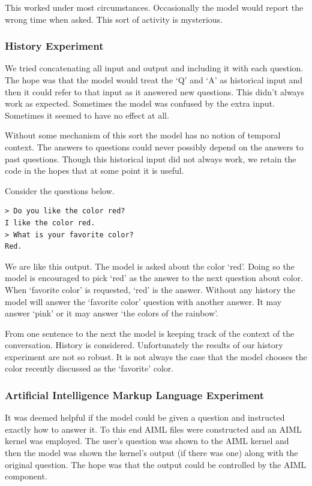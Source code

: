This worked under most circumstances. Occasionally the model would report the wrong time when asked. This sort of activity is mysterious.

\subsubsection{History Experiment}
We tried concatenating all input and output and including it with each question. The hope was that the model would treat the `Q' and `A' as historical input and then it could refer to that input as it answered new questions. This didn't always work as expected. Sometimes the model was confused by the extra input. Sometimes it seemed to have no effect at all.

Without some mechanism of this sort the model has no notion of temporal context. The answers to questions could never possibly depend on the answers to past questions. Though this historical input did not always work, we retain the code in the hopes that at some point it is useful.

Consider the questions below.
\begin{verbatim}
> Do you like the color red?
I like the color red.
> What is your favorite color?
Red.
\end{verbatim}
We are like this output. The model is asked about the color `red'. Doing so the model is encouraged to pick `red' as the answer to the next question about color. When `favorite color' is requested, `red' is the answer. Without any history the model will answer the `favorite color' question with another answer. It may answer `pink' or it may answer `the colors of the rainbow'. 

From one sentence to the next the model is keeping track of the context of the conversation. History is considered. Unfortunately the results of our history experiment are not so robust. It is not always the case that the model chooses the color recently discussed as the `favorite' color.

\subsubsection{Artificial Intelligence Markup Language Experiment}
It was deemed helpful if the model could be given a question and instructed exactly how to answer it. To this end AIML files were constructed and an AIML kernel was employed. The user's question was shown to the AIML kernel and then the model was shown the kernel's output (if there was one) along with the original question. The hope was that the output could be controlled by the AIML component. 

